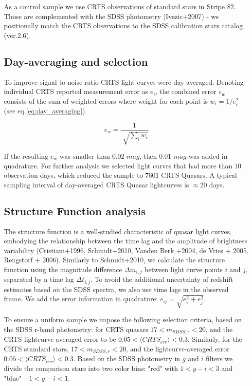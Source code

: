\documentclass[a4paper,fleqn,usenatbib]{mnras}
\begin{document}
As a control sample we use CRTS observations of standard stars in Stripe 82. Those are  complemented with the SDSS photometry (Ivezic+2007) - we positionally  match the CRTS observations to the SDSS calibration stars catalog (ver.2.6). 


\subsection{Day-averaging and selection}
\label{sec:sample_sel}


To improve signal-to-noise ratio CRTS light curves were day-averaged.  Denoting individual CRTS reported measurement error as $e_{i}$, the combined error $e_{w}$ consists of the sum of weighted errors where weight for each point is $ w_{i} = 1 / e_{i}^{2}$ (see eq.\ref{eq:day_averaging}). 


\begin{equation}
\label{eq:day_averaging}
 e_{w} = \frac{1}{\sqrt[]{\sum_{i} w_{i}}}
\end{equation}

If the resulting $e_{w}$ was smaller than $0.02$ $mag$, then  $0.01$ $mag$ was added in quadrature. For further analysis we selected light curves that had more than $10$ observation days, which reduced the sample to $7601$ CRTS Quasars. A typical sampling interval of day-averaged CRTS Quasar lightcurves is $\approx 20$ days. 

\subsection{Structure Function analysis}

 The structure function is a well-studied characteristic of quasar light curves, embodying the relationship between the time lag and the amplitude of brightness variability (Cristiani+1996, Schmidt+2010, Vanden Berk +2004, de Vries + 2005, Rengstorf + 2006). Similarly to Schmidt+2010, we  calculate the structure function using  the magnitude difference $\Delta m _{i,j}$ between light curve points $i$ and $j$, separated by a time lag $\Delta t_{i,j}$. To avoid the additional uncertainty of redshift estimates based on the SDSS spectra, we also use time lags in the observed frame. We add the error information in quadrature: $e_{ij} = \sqrt{e_{i}^{2}+e_{j}^{2}}$.

To ensure a uniform sample we impose the following selection criteria, based on the SDSS r-band photometry: for CRTS quasars  $17< m_{SDSS,r} < 20$, and the CRTS lightcurve-averaged error to be  $0.05 < \langle CRTS_{err} \rangle < 0.3$. Similarly, for the CRTS standard stars, $17 < m_{SDSS,r} < 20 $, and the lightcurve-averaged error $0.05 < \langle CRTS_{err} \rangle < 0.3$. Based on the SDSS photometry in $g$ and $i$ filters  we divide the comparison stars into two color bins: "red" with   $1 < g-i < 3$ and "blue" $-1 < g-i < 1$. 
\end{document}
